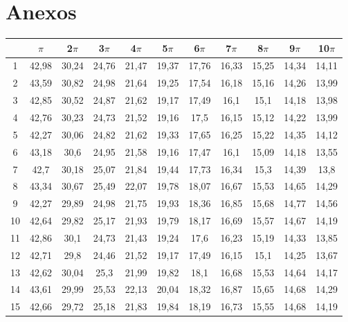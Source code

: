 \documentclass[a4paper]{article}
\begin{document}
\section{Anexos}

\begin{table}[!ht]
    \centering
    \begin{tabular}{|c|c|c|c|c|c|c|c|c|c|c|}
    \hline
         & $\pi$ & 2$\pi$ & 3$\pi$ & 4$\pi$ & 5$\pi$ & 6$\pi$ & 7$\pi$ & 8$\pi$ & 9$\pi$ & 10$\pi$ \\ \hline
        1 & 42,98 & 30,24 & 24,76 & 21,47 & 19,37 & 17,76 & 16,33 & 15,25 & 14,34 & 14,11
\\ \hline
        2 & 43,59 & 30,82 & 24,98 & 21,64 & 19,25 & 17,54 & 16,18 & 15,16 & 14,26 & 13,99
\\ \hline
        3 & 42,85 & 30,52 & 24,87 & 21,62 & 19,17 & 17,49 & 16,1 & 15,1 & 14,18 & 13,98
\\ \hline
        4 & 42,76 & 30,23 & 24,73 & 21,52 & 19,16 & 17,5 & 16,15 & 15,12 & 14,22 & 13,99
\\ \hline
        5 & 42,27 & 30,06 & 24,82 & 21,62 & 19,33 & 17,65 & 16,25 & 15,22 & 14,35 & 14,12
\\ \hline
        6 & 43,18 & 30,6 & 24,95 & 21,58 & 19,16 & 17,47 & 16,1 & 15,09 & 14,18 & 13,55
\\ \hline
        7 & 42,7 & 30,18 & 25,07 & 21,84 & 19,44 & 17,73 & 16,34 & 15,3 & 14,39 & 13,8
\\ \hline
        8 & 43,34 & 30,67 & 25,49 & 22,07 & 19,78 & 18,07 & 16,67 & 15,53 & 14,65 & 14,29
\\ \hline
        9 & 42,27 & 29,89 & 24,98 & 21,75 & 19,93 & 18,36 & 16,85 & 15,68 & 14,77 & 14,56
\\ \hline
        10 & 42,64 & 29,82 & 25,17 & 21,93 & 19,79 & 18,17 & 16,69 & 15,57 & 14,67 & 14,19
\\ \hline
        11 & 42,86 & 30,1 & 24,73 & 21,43 & 19,24 & 17,6 & 16,23 & 15,19 & 14,33 & 13,85
\\ \hline
        12 & 42,71 & 29,8 & 24,46 & 21,52 & 19,17 & 17,49 & 16,15 & 15,1 & 14,25 & 13,67
\\ \hline
        13 & 42,62 & 30,04 & 25,3 & 21,99 & 19,82 & 18,1 & 16,68 & 15,53 & 14,64 & 14,17
\\ \hline
        14 & 43,61 & 29,99 & 25,53 & 22,13 & 20,04 & 18,32 & 16,87 & 15,65 & 14,68 & 14,29
\\ \hline
        15 & 42,66 & 29,72 & 25,18 & 21,83 & 19,84 & 18,19 & 16,73 & 15,55 & 14,68 & 14,19
\\ \hline

\end{tabular}
\end{table}
\end{document}
